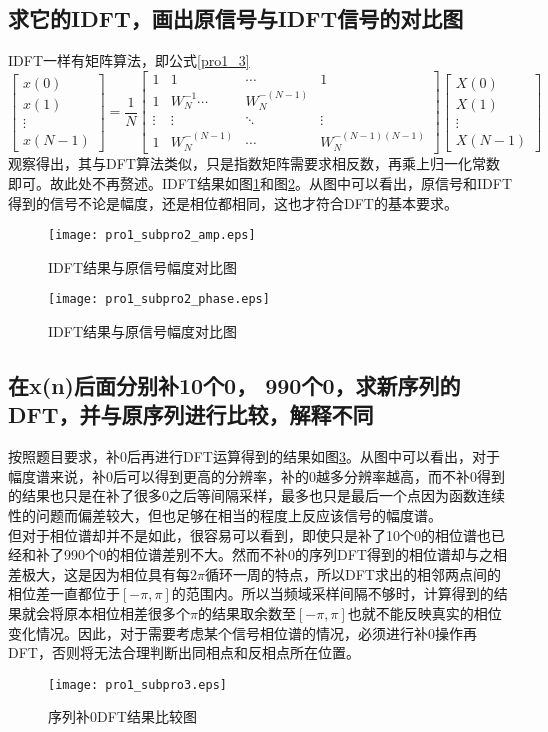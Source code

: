 \documentclass[aps,letterpaper,10pt]{revtex4}
\begin{document}
\begin{CJK}{UTF8}{gkai}
\subsection{求它的IDFT，画出原信号与IDFT信号的对比图}
IDFT一样有矩阵算法，即公式\ref{pro1_3}
\begin{equation}
\left[\begin{array}{c}
x(0)\\
x(1)\\
\vdots\\
x(N-1)
\end{array}\right]
=
\frac{1}{N}
\left[\begin{array}{cccc}
1 & 1 & \cdots & 1\\
1 & W_N^{-1} \cdots & W_N^{-(N-1)}\\
\vdots&\vdots&\ddots&\vdots\\
1 & W_N^{-(N-1)} & \cdots & W_N^{-(N-1)(N-1)}
\end{array}
\right]
\left[
\begin{array}{c}
  X(0)\\
  X(1)\\
  \vdots\\
  X(N-1)
\end{array}
\right]\label{pro1_3}
\end{equation}
观察得出，其与DFT算法类似，只是指数矩阵需要求相反数，再乘上归一化常数即可。故此处不再赘述。IDFT结果如图\ref{pro1_fig2}和图\ref{pro1_fig3}。从图中可以看出，原信号和IDFT得到的信号不论是幅度，还是相位都相同，这也才符合DFT的基本要求。
\begin{figure}
  \centering
  \texttt{[image: pro1\_subpro2\_amp.eps]}
  \caption{IDFT结果与原信号幅度对比图}
  \label{pro1_fig2}
\end{figure}
\begin{figure}
  \centering
  \texttt{[image: pro1\_subpro2\_phase.eps]}
  \caption{IDFT结果与原信号幅度对比图}
  \label{pro1_fig3}
\end{figure}
\subsection{在x(n)后面分别补10个0， 990个0，求新序列的DFT，并与原序列进行比较，解释不同}
按照题目要求，补0后再进行DFT运算得到的结果如图\ref{pro1_fig4}。从图中可以看出，对于幅度谱来说，补0后可以得到更高的分辨率，补的0越多分辨率越高，而不补0得到的结果也只是在补了很多0之后等间隔采样，最多也只是最后一个点因为函数连续性的问题而偏差较大，但也足够在相当的程度上反应该信号的幅度谱。\\
但对于相位谱却并不是如此，很容易可以看到，即使只是补了10个0的相位谱也已经和补了990个0的相位谱差别不大。然而不补0的序列DFT得到的相位谱却与之相差极大，这是因为相位具有每$2\pi$循环一周的特点，所以DFT求出的相邻两点间的相位差一直都位于$[-\pi,\pi]$的范围内。所以当频域采样间隔不够时，计算得到的结果就会将原本相位相差很多个$\pi$的结果取余数至$[-\pi,\pi]$也就不能反映真实的相位变化情况。因此，对于需要考虑某个信号相位谱的情况，必须进行补0操作再DFT，否则将无法合理判断出同相点和反相点所在位置。
\begin{figure}
  \centering
  \texttt{[image: pro1\_subpro3.eps]}
  \caption{序列补0DFT结果比较图}
  \label{pro1_fig4}
\end{figure}

\end{CJK}
\end{document}
